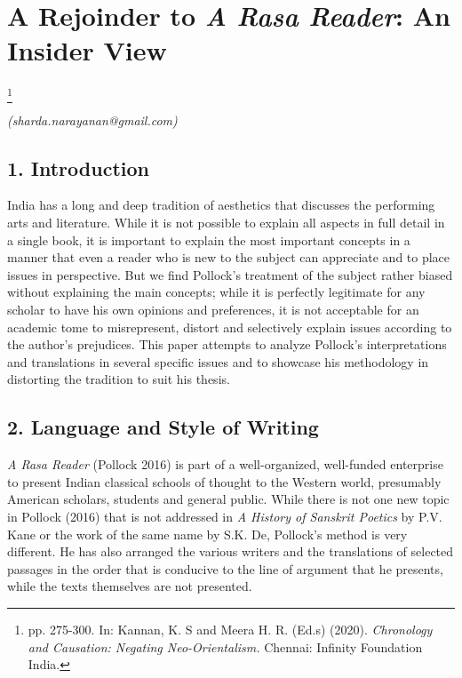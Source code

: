 
\chapter{\hspace{1.8cm} A Rejoinder to \textit{A Rasa Reader}: \hfill\break An Insider View}\label{chapter9}

\footnote{pp. 275-300. In: Kannan, K. S and Meera H. R. (Ed.s) (2020). \textit{Chronology and Causation: Negating Neo-Orientalism.} Chennai: Infinity Foundation India.}

\begin{flushright}
\textit{(sharda.narayanan@gmail.com)}
\end{flushright}


\section*{1. Introduction}

India has a long and deep tradition of aesthetics that discusses the performing arts and literature. While it is not possible to explain all aspects in full detail in a single book, it is important to explain the most important concepts in a manner that even a reader who is new to the subject can appreciate and to place issues in perspective. But we find Pollock’s treatment of the subject rather biased without explaining the main concepts; while it is perfectly legitimate for any scholar to have his own opinions and preferences, it is not acceptable for an academic tome to misrepresent, distort and selectively explain issues according to the author’s prejudices. This paper attempts to analyze Pollock’s interpretations and translations in several specific issues and to showcase his methodology in distorting the tradition to suit his thesis.


\section*{2. Language and Style of Writing}

\textit{A Rasa Reader} (Pollock 2016) is part of a well-organized, well-funded enterprise to present Indian classical schools of thought to the Western world, presumably American scholars, students and general public. While there is not one new topic in Pollock (2016) that is not addressed in \textit{A History of Sanskrit Poetics} by P.V. Kane or the work of the same name by S.K. De, Pollock’s method is very different. He has also arranged the various writers and the translations of selected passages in the order that is conducive to the line of argument that he presents, while the texts themselves are not presented.

